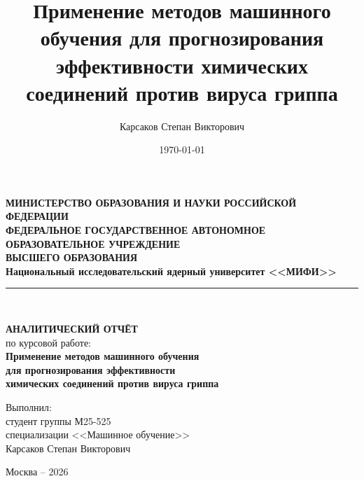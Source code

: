 \documentclass[12pt,a4paper]{report}
\title{Применение методов машинного обучения для прогнозирования эффективности химических соединений против вируса гриппа}
\author{Карсаков Степан Викторович}
\date{\today}
\begin{document}
\begin{titlepage}
    \begin{center}
        \vspace*{-1cm}

        {\small\textbf{МИНИСТЕРСТВО ОБРАЗОВАНИЯ И НАУКИ РОССИЙСКОЙ ФЕДЕРАЦИИ}}\\[0.15cm]
        {\small\textbf{ФЕДЕРАЛЬНОЕ ГОСУДАРСТВЕННОЕ АВТОНОМНОЕ ОБРАЗОВАТЕЛЬНОЕ УЧРЕЖДЕНИЕ}}\\[0.1cm]
        {\small\textbf{ВЫСШЕГО ОБРАЗОВАНИЯ}}\\[0.3cm]
        {\large\textbf{Национальный исследовательский ядерный университет <<МИФИ>>}}\\[0.8cm]

        \rule{\textwidth}{0.8pt}\\[0.6cm]


        \vspace{1cm}

        {\LARGE\textbf{АНАЛИТИЧЕСКИЙ ОТЧЁТ}}\\[0.4cm]
        {\Large по курсовой работе:}\\[0.6cm]

        {\LARGE\textbf{Применение методов машинного обучения}}\\[0.3cm]
        {\LARGE\textbf{для прогнозирования эффективности}}\\[0.3cm]
        {\LARGE\textbf{химических соединений против вируса гриппа}}\\[1.5cm]

        \vspace{0.8cm}

        \begin{flushright}
            \begin{minipage}{0.55\textwidth}
                \raggedleft
                Выполнил:\\[0.2cm]
                студент группы М25-525\\[0.1cm]
                специализации <<Машинное обучение>>\\[0.2cm]
               Карсаков Степан Викторович\\[0.8cm]
            \end{minipage}
        \end{flushright}

        \vfill

        {\large Москва -- 2026}
    \end{center}
\end{titlepage}
\end{document}

